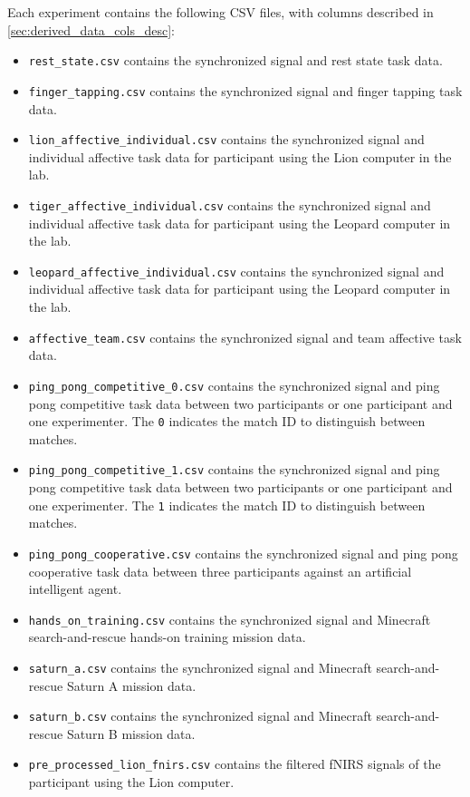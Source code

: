 Each experiment contains the following CSV files, with columns described in \ref{sec:derived_data_cols_desc}:
%
\begin{itemize}
  \item \texttt{rest\_state.csv} contains the synchronized signal and rest state task data.
  \item \texttt{finger\_tapping.csv} contains the synchronized signal and finger tapping task data.
  \item \texttt{lion\_affective\_individual.csv} contains the synchronized signal and individual affective task data for participant using the Lion computer in the lab.
  \item \texttt{tiger\_affective\_individual.csv} contains the synchronized signal and individual affective task data for participant using the Leopard computer in the lab.
  \item \texttt{leopard\_affective\_individual.csv} contains the synchronized signal and individual affective task data for participant using the Leopard computer in the lab.
  \item \texttt{affective\_team.csv} contains the synchronized signal and team affective task data.
  \item \texttt{ping\_pong\_competitive\_0.csv} contains the synchronized signal and ping pong competitive task data between two participants or one participant and one experimenter. The \texttt{0} indicates the match ID to distinguish between matches.
  \item \texttt{ping\_pong\_competitive\_1.csv} contains the synchronized signal and ping pong competitive task data between two participants or one participant and one experimenter. The \texttt{1} indicates the match ID to distinguish between matches.
  \item \texttt{ping\_pong\_cooperative.csv} contains the synchronized signal and ping pong cooperative task data between three participants against an artificial intelligent agent.
  \item \texttt{hands\_on\_training.csv} contains the synchronized signal and Minecraft search-and-rescue hands-on training mission data.
  \item \texttt{saturn\_a.csv} contains the synchronized signal and Minecraft search-and-rescue Saturn A mission data.
  \item \texttt{saturn\_b.csv} contains the synchronized signal and Minecraft search-and-rescue Saturn B mission data.
  \item \texttt{pre\_processed\_lion\_fnirs.csv}  contains the filtered fNIRS signals of the participant using the Lion computer.

\end{itemize}
